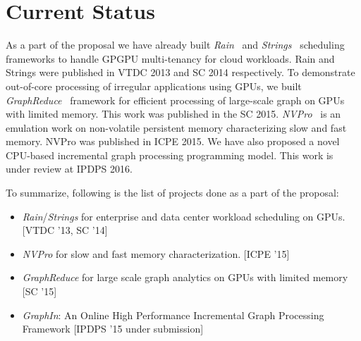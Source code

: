 \chapter{Current Status}
\label{status}
As a part of the proposal we have already built \textit{Rain}~\cite{Rain} and \textit{Strings}~\cite{Strings} scheduling frameworks to handle GPGPU multi-tenancy for cloud workloads. Rain and Strings were published in VTDC 2013 and SC 2014 respectively. To demonstrate out-of-core  processing of irregular applications using GPUs, we built \textit{GraphReduce}~\cite{GraphReduce} framework for efficient processing of  large-scale graph on GPUs with limited memory. This work was published in the SC 2015. \textit{NVPro}~\cite{NVPro} is an emulation work on non-volatile persistent memory characterizing slow and fast memory.  NVPro was published in ICPE 2015. We have also proposed a novel CPU-based incremental graph processing programming model. This work is under review at IPDPS 2016.

To summarize, following is the list of projects done as a part of the proposal:  
\begin{itemize}
\item \textit{ Rain}/\textit{Strings} for enterprise and data center workload scheduling on GPUs. [VTDC '13, SC '14]
\item \textit{NVPro} for slow and fast memory characterization. [ICPE '15]
\item \textit{GraphReduce} for large scale graph analytics on GPUs with limited memory [SC '15]	
\item \textit{GraphIn}: An Online High Performance Incremental Graph Processing Framework [IPDPS '15 under submission]
\end{itemize}
